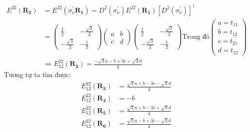 \documentclass{report}
\begin{document}
\begin{align*}
	E^{22} (\mathbf{R_2}) & = E^{22}(\sigma_\nu^{'} \mathbf{R_1}) = D^2(\sigma^{'}_\nu) E^{22} (\mathbf{R_1}) [D^2(\sigma_\nu ^{'})]^\dagger \\
	                      & =
	\begin{pmatrix}
		\frac{1}{2}         & -\frac{\sqrt{3}}{2} \\
		-\frac{\sqrt{3}}{2} & -\frac{1}{2}
	\end{pmatrix} \begin{pmatrix}
		              a & b \\
		              c & d
	              \end{pmatrix}\begin{pmatrix}
		                           \frac{1}{2}         & -\frac{\sqrt{3}}{2} \\
		                           -\frac{\sqrt{3}}{2} & -\frac{1}{2}
	                           \end{pmatrix}\text{Trong đó}\begin{pmatrix}
		                                                       a = t_{11} \\
		                                                       b = t_{12} \\
		                                                       c = t_{21} \\
		                                                       d = t_{22}
	                                                       \end{pmatrix}                                                      \\
	                      & \Rightarrow E^{22}_{12} (\mathbf{R_2}) = \frac{-\sqrt{3}a - b + 3c + \sqrt{3}d}{4}
\end{align*}
Tương tự ta tìm được:
\begin{align*}
	E^{22}_{12} (\mathbf{R_3}) & = \frac{\sqrt{3}a + b - 3c - \sqrt{3}d}{4} \\
	E^{22}_{12} (\mathbf{R_4}) & = -b                                       \\
	E^{22}_{12} (\mathbf{R_5}) & = \frac{\sqrt{3}a + b - 3c + \sqrt{3}d}{4} \\
	E^{22}_{12} (\mathbf{R_6}) & = \frac{\sqrt{3}a - b + 3c - \sqrt{3}d}{4} \\
\end{align*}

\clearpage
\end{document}
